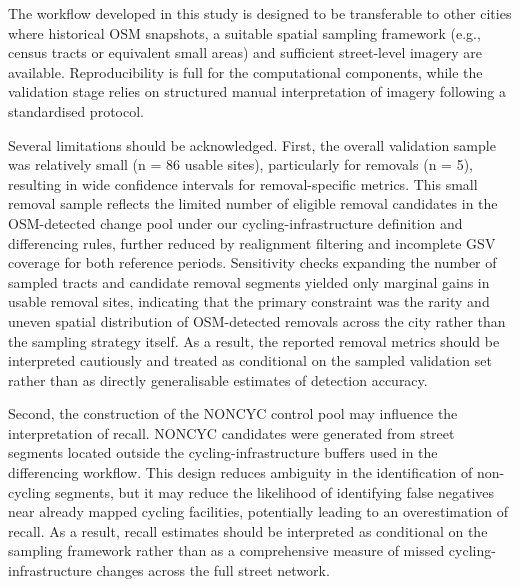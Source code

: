 \documentclass[
]{article}
\begin{document}
The workflow developed in this study is designed to be transferable to
other cities where historical OSM snapshots, a suitable spatial sampling
framework (e.g., census tracts or equivalent small areas) and sufficient
street-level imagery are available. \color{blue}Reproducibility is full
for the computational components, while the validation stage relies on
structured manual interpretation of imagery following a standardised
protocol.\color{black}

Several limitations should be acknowledged. First, the
\color{blue}overall validation sample was relatively small (n = 86
usable sites), particularly for removals (n = 5), \color{black}
resulting in wide confidence intervals for removal-specific metrics.
This small removal sample reflects the limited number of eligible
removal candidates in the OSM-detected change pool under our
cycling-infrastructure definition and differencing rules, further
reduced by realignment filtering and incomplete GSV coverage for both
reference periods. Sensitivity checks expanding the number of sampled
tracts and candidate removal segments yielded only marginal gains in
usable removal sites, indicating that the primary constraint was the
rarity and uneven spatial distribution of OSM-detected removals across
the city rather than the sampling strategy itself. \color{blue} As a
result, the reported removal metrics should be interpreted cautiously
and treated as conditional on the sampled validation set rather than as
directly generalisable estimates of detection accuracy. \color{black}

\color{blue}Second, the construction of the NONCYC control pool may
influence the interpretation of recall. NONCYC candidates were generated
from street segments located outside the cycling-infrastructure buffers
used in the differencing workflow. This design reduces ambiguity in the
identification of non-cycling segments, but it may reduce the likelihood
of identifying false negatives near already mapped cycling facilities,
potentially leading to an overestimation of recall. As a result, recall
estimates should be interpreted as conditional on the sampling framework
rather than as a comprehensive measure of missed cycling-infrastructure
changes across the full street network.\color{black}
\end{document}
